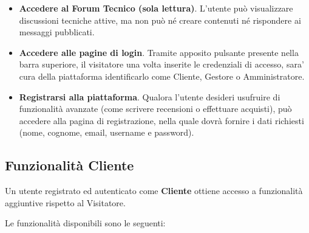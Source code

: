 \documentclass[a4paper,12pt]{report}
\begin{document}
\begin{itemize}
    \item \textbf{Accedere al Forum Tecnico (sola lettura)}.  
    L’utente può visualizzare discussioni tecniche attive, ma non può né
    creare contenuti né rispondere ai messaggi pubblicati.

    \item \textbf{Accedere alle pagine di login}.  
    Tramite apposito pulsante presente nella barra superiore,
    il visitatore una volta inserite le credenziali di accesso, sara' cura della piattaforma identificarlo come Cliente, Gestore o
    Amministratore.

    \item \textbf{Registrarsi alla piattaforma}.  
    Qualora l’utente desideri usufruire di funzionalità avanzate
    (come scrivere recensioni o effettuare acquisti),
    può accedere alla pagina di registrazione, nella quale dovrà fornire
    i dati richiesti (nome, cognome, email, username e password).
\end{itemize}

\subsection{Funzionalità Cliente}
\label{sec:cliente}
Un utente registrato ed autenticato come \textbf{Cliente} ottiene accesso a
funzionalità aggiuntive rispetto al Visitatore.  

Le funzionalità disponibili sono le seguenti:
\end{document}
